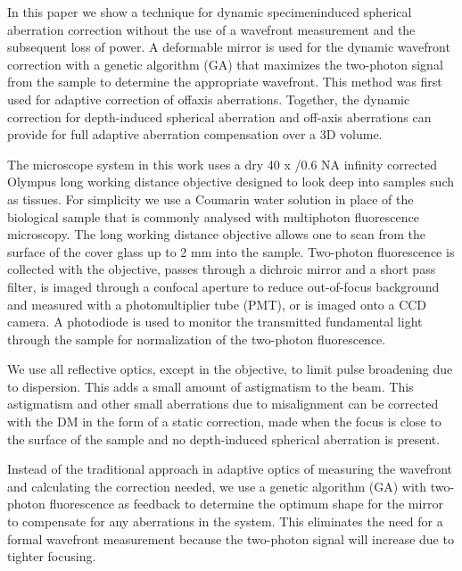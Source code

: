 In this paper we show a technique for dynamic specimeninduced spherical aberration correction without the use of a wavefront measurement and the subsequent loss of power. A deformable mirror is used for the dynamic wavefront correction with a genetic algorithm (GA) that maximizes the two-photon signal from the sample to determine the appropriate wavefront. This method was first used for adaptive correction of offaxis aberrations\cite{Genetic_smart_algorithm}. Together, the dynamic correction for depth-induced spherical aberration and off-axis aberrations can provide for full adaptive aberration compensation over a 3D volume.

The microscope system in this work uses a dry 40 x /0.6 NA infinity corrected Olympus long working distance objective designed to look deep into samples such as tissues. For simplicity we use a Coumarin water solution in place of the biological sample that is commonly analysed with multiphoton fluorescence microscopy. The long working distance objective allows one to scan from the surface of the cover glass up to 2 mm into the sample. Two-photon fluorescence is collected with the objective, passes through a dichroic mirror and a short pass filter, is imaged through a confocal aperture to reduce out-of-focus background and measured with a photomultiplier tube (PMT), or is imaged onto a CCD camera. A photodiode is used to monitor the transmitted fundamental light through the sample for normalization of the two-photon fluorescence.

We use all reflective optics, except in the objective, to limit pulse broadening due to dispersion. This adds a small amount of astigmatism to the beam. This astigmatism and other small aberrations due to misalignment can be corrected with the DM in the form of a static correction, made when the focus is close to the surface of the sample and no depth-induced spherical aberration is present.

Instead of the traditional approach in adaptive optics of measuring the wavefront and calculating the correction needed, we use a genetic algorithm (GA) with two-photon fluorescence as feedback to determine the optimum shape for the mirror to compensate for any aberrations in the system. This eliminates the need for a formal wavefront measurement because the two-photon signal will increase due to tighter focusing.

